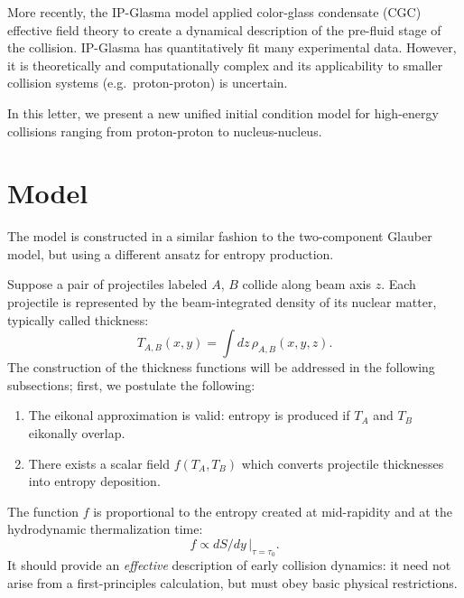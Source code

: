 \documentclass[aps,prl,reprint,amsmath,nofootinbib]{revtex4-1}
\begin{document}
More recently, the IP-Glasma model applied color-glass condensate (CGC) effective field theory to create a
dynamical description of the pre-fluid stage of the collision.  IP-Glasma has quantitatively fit many
experimental data.  However, it is theoretically and computationally complex and its applicability to smaller
collision systems (e.g.~proton-proton) is uncertain.

In this letter, we present a new unified initial condition model for high-energy collisions ranging from
proton-proton to nucleus-nucleus.


\section{Model}

The model is constructed in a similar fashion to the two-component Glauber model, but using a different ansatz
for entropy production.

Suppose a pair of projectiles labeled $A$, $B$ collide along beam axis $z$.  Each projectile is represented by
the beam-integrated density of its nuclear matter, typically called thickness:
\begin{equation}
  T_{A,B}(x, y) = \int dz \, \rho_{A,B}(x, y, z).
\end{equation}
The construction of the thickness functions will be addressed in the following subsections; first, we
postulate the following:
\begin{enumerate}
  \item The eikonal approximation is valid:  entropy is produced if $T_A$ and $T_B$ eikonally overlap.
  \item There exists a scalar field $f(T_A, T_B)$ which converts projectile thicknesses into entropy
    deposition.
\end{enumerate}
The function $f$ is proportional to the entropy created at mid-rapidity and at the hydrodynamic thermalization
time:
\begin{equation}
  f \propto dS/dy \, |_{\tau = \tau_0}.
\end{equation}
It should provide an \emph{effective} description of early collision dynamics:  it need not arise from a
first-principles calculation, but must obey basic physical restrictions.
\end{document}
